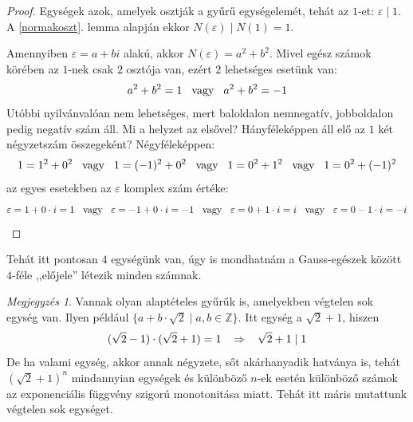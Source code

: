 \documentclass[12pt]{book}
\theoremstyle{plain} %
\theoremstyle{definition} %
\theoremstyle{remark}
\newtheorem*{mj}{Megjegyzés}
\numberwithin{equation}{section}  %
\def\Z{\mathbb{Z}}
\begin{document}
	\begin{proof}
		Egységek azok, amelyek osztják a gyűrű egységelemét, tehát az $1$-et: $\varepsilon\mid 1$. A \ref{normakoszt}. lemma alapján ekkor $N(\varepsilon)\mid N(1)=1$.
		
		Amennyiben $\varepsilon=a+bi$ alakú, akkor $N(\varepsilon)=a^2+b^2$. Mivel egész számok körében az $1$-nek csak $2$ osztója van, ezért $2$ lehetséges esetünk van:
		\[ a^2+b^2 = 1 \hspace{3mm} \text{vagy} \hspace{3mm} a^2+b^2=-1  \]
		Utóbbi nyilvánvalóan nem lehetséges, mert baloldalon nemnegatív, jobboldalon pedig negatív szám áll. Mi a helyzet az elsővel? Hányféleképpen áll elő az $1$ két négyzetszám összegeként? Négyféleképpen:
		\[ 1=1^2+0^2 \hspace{3mm} \text{vagy} \hspace{3mm} 1=(-1)^2+0^2 \hspace{3mm} \text{vagy} \hspace{3mm} 1=0^2+1^2 \hspace{3mm} \text{vagy} \hspace{3mm} 1=0^2+(-1)^2 \]
		az egyes esetekben az $\varepsilon$ komplex szám értéke:
		\[ \varepsilon=1+0\cdot i=1 \hspace{3mm} \text{vagy} \hspace{3mm} \varepsilon=-1+0\cdot i=-1 \hspace{3mm} \text{vagy} \hspace{3mm} \varepsilon=0+1\cdot i=i \hspace{3mm} \text{vagy} \hspace{3mm} \varepsilon=0-1\cdot i = -i \]
	\end{proof}

	Tehát itt pontosan $4$ egységünk van, úgy is mondhatnám a Gauss-egészek között $4$-féle ,,előjele'' létezik minden számnak.
	
	\begin{mj}
		Vannak olyan alaptételes gyűrűk is, amelyekben végtelen sok egység van. Ilyen például $\{a+b\cdot\sqrt{2} \mid a,b\in \Z \}$. Itt egység a $\sqrt{2}+1$, hiszen
		\[ (\sqrt{2}-1)\cdot(\sqrt{2}+1) = 1 \hspace{3mm} \Rightarrow \hspace{3mm} \sqrt{2}+1\mid 1  \]
		De ha valami egység, akkor annak négyzete, sőt akárhanyadik hatványa is, tehát $(\sqrt{2}+1)^n$ mindannyian egységek és különböző $n$-ek esetén különböző számok az exponenciális függvény szigorú monotonitása miatt. Tehát itt máris mutattunk végtelen sok egységet.
	\end{mj}
	
\end{document}
